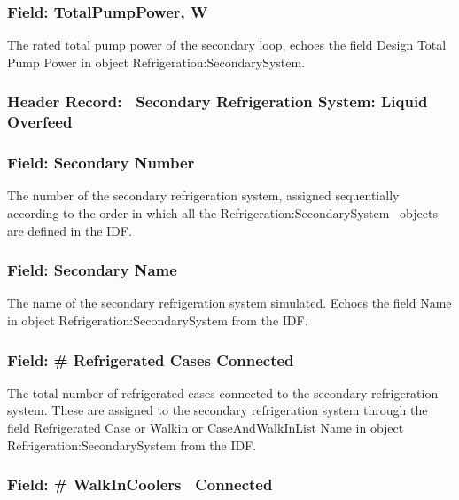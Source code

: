 \subsubsection{Field: TotalPumpPower, W}\label{field-totalpumppower-w}

The rated total pump power of the secondary loop, echoes the field Design Total Pump Power in object Refrigeration:SecondarySystem.

\subsubsection{Header Record:~ Secondary Refrigeration System: Liquid Overfeed}\label{header-record-secondary-refrigeration-system-liquid-overfeed}

\subsubsection{Field: Secondary Number}\label{field-secondary-number-2}

The number of the secondary refrigeration system, assigned sequentially according to the order in which all the Refrigeration:SecondarySystem~ objects are defined in the IDF.

\subsubsection{Field: Secondary Name}\label{field-secondary-name-1}

The name of the secondary refrigeration system simulated. Echoes the field Name in object Refrigeration:SecondarySystem from the IDF.

\subsubsection{Field: \# Refrigerated Cases Connected}\label{field-refrigerated-cases-connected-3}

The total number of refrigerated cases connected to the secondary refrigeration system. These are assigned to the secondary refrigeration system through the field Refrigerated Case or Walkin or CaseAndWalkInList Name in object Refrigeration:SecondarySystem from the IDF.

\subsubsection{Field: \# WalkInCoolers~ Connected}\label{field-walkincoolers-connected-3}

